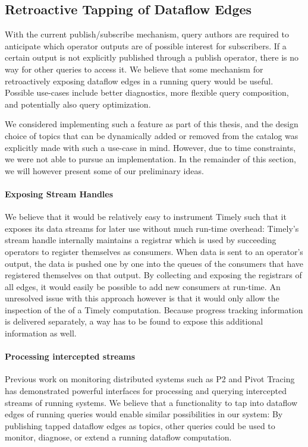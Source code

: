 \subsection{Retroactive Tapping of Dataflow Edges}

With the current publish/subscribe mechanism, query authors are required to
anticipate which operator outputs are of possible interest for subscribers. If
a certain output is not explicitly published through a publish operator, there
is no way for other queries to access it. We believe that some mechanism
for retroactively exposing dataflow edges in a running query would be useful.
Possible use-cases include better diagnostics, more flexible query composition,
and potentially also query optimization.

We considered implementing such a feature as part
of this thesis, and the design choice of topics that can be dynamically added
or removed from the catalog was  explicitly made with such a use-case in mind.
However, due to time constraints, we were not able to pursue an implementation.
In the remainder of this section, we will however present some of our
preliminary ideas.

\paragraph{Exposing Stream Handles}

We believe that it would be relatively easy to instrument Timely such
that it exposes its data streams for later use without much run-time
overhead: Timely's stream handle internally maintains a registrar which
is used by succeeding operators to register themselves as consumers.
When data is sent to an operator's output, the data is pushed one by one into the
queues of the consumers that have registered themselves on that output. By collecting and exposing
the registrars of all edges, it would easily be possible to add new consumers
at run-time. An unresolved issue with this approach however is that it would only allow
the inspection of the  of a Timely computation. Because
progress tracking information is delivered separately, a way has to be found to
expose this additional information as well.

\paragraph{Processing intercepted streams}

Previous work on monitoring distributed systems such as P2 \cite{p2} and
Pivot Tracing \cite{pivot} has demonstrated powerful interfaces for
processing and querying intercepted streams of running systems.
We believe that a functionality to tap into dataflow edges of running queries would
enable similar possibilities in our system: By publishing tapped
dataflow edges as topics, other queries could be used to monitor, diagnose, or
extend a running dataflow computation.


